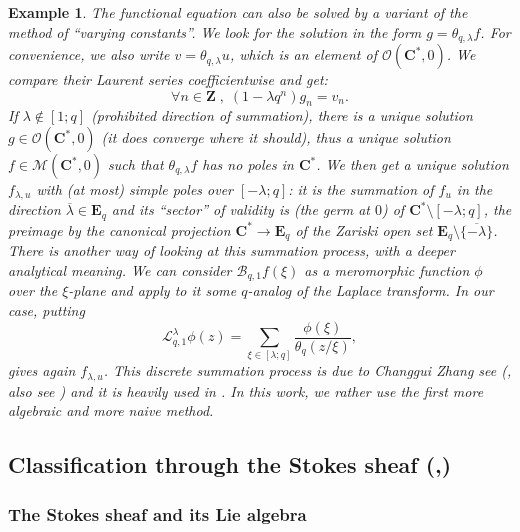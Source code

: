 \documentclass[english]{smfart}
\newtheorem{example}[thm]{Example}
\numberwithin{equation}{thm}
\def\C{{\mathbf C}}
\def\Z{{\mathbf Z}}
\def\B{{\mathcal{B}}}
\def\Eq{{\mathbf{E}_{q}}}
\def\Rwg{{\mathcal{O}(\C^{*},0)}}
\def\Kwg{{\mathcal{M}(\C^{*},0)}}
\def\la{\lambda}
\def\th{\theta}
\begin{document}
\begin{example}
The functional equation can also be solved by a variant of the method
of ``varying constants''. We look for the solution in the form
$g = \th_{q,\la} f$. For convenience, we also write $v = \th_{q,\la} u$,
which is an element of $\Rwg$. We compare their Laurent series
coefficientwise and get:
$$
\forall n \in \Z \;,\; (1 - \la q^{n}) g_{n} = v_{n}.
$$
If $\la \not\in [1;q]$ (prohibited direction of summation),
there is a unique solution $g \in \Rwg$ (it does converge
where it should), thus a unique solution $f \in \Kwg$ such that 
$\th_{q,\la} f$ has no poles in $\C^{*}$. We then get a unique
solution $f_{\la,u}$ with (at most) simple poles over $[-\la;q]$:
it is the summation of $\hat{f}_{u}$ in the direction 
$\overline{\la} \in \Eq$ and its ``sector'' of validity is
(the germ at $0$) of $\C^{*} \setminus [-\la;q]$,
the preimage by the canonical projection $\C^{*} \rightarrow \Eq$ 
of the Zariski open set $\Eq \setminus \{\overline{-\la}\}$. \\

There is another way of looking at this summation process, 
with a deeper analytical meaning. We can consider $\B_{q,1} f(\xi)$
as a meromorphic function $\phi$ over the $\xi$-plane and apply to it
some $q$-analog of the Laplace transform. In our case, putting
$$
\mathcal{L}_{q,1}^{\la} \phi(z) =
\sum_{\xi \in [\la;q]} \frac{\phi(\xi)}{\th_{q}(z/\xi)},
$$
gives again $f_{\la,u}$. This \emph{discrete summation} process 
is due to Changgui Zhang see (\cite{Zha02}, also see \cite{DRSZ}) 
and it is heavily used in \cite{RSZ}. In this work, we rather use 
the first more algebraic and more naive method.
\end{example}


\subsection{Classification through the Stokes sheaf 
(\cite{RSZ},\cite{RSZcras1})}
\label{subsection:irregular-theory}

\subsubsection*{The Stokes sheaf and its Lie algebra}
\end{document}
